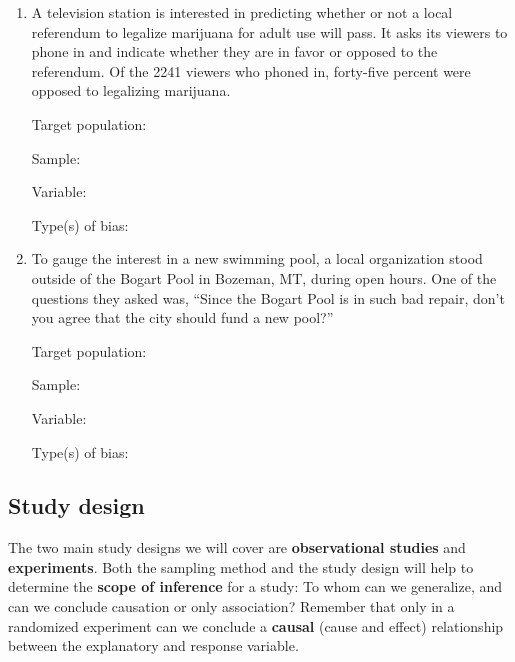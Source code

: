\documentclass[
]{report}
\begin{document}
\newpage

\begin{enumerate}
\def\labelenumi{\arabic{enumi}.}
\setcounter{enumi}{2}
\item
  A television station is interested in predicting whether or not a local referendum to legalize marijuana for adult use will pass. It asks its viewers to phone in and indicate whether they are in favor or opposed to the referendum. Of the 2241 viewers who phoned in, forty-five percent were opposed to legalizing marijuana.
  \vspace{0.1in}

  Target population:
  \vspace{0.3in}

  Sample:
  \vspace{0.3in}

  Variable:
  \vspace{0.3in}

  Type(s) of bias:
  \vspace{0.3in}
\item
  To gauge the interest in a new swimming pool, a local organization stood outside of the Bogart Pool in Bozeman, MT, during open hours. One of the questions they asked was, ``Since the Bogart Pool is in such bad repair, don't you agree that the city should fund a new pool?''
  \vspace{0.1in}

  Target population:
  \vspace{0.3in}

  Sample:
  \vspace{0.3in}

  Variable:
  \vspace{0.3in}

  Type(s) of bias:
  \vspace{0.3in}
\end{enumerate}

\newpage

\hypertarget{study-design-1}{%
\subsection{Study design}\label{study-design-1}}

The two main study designs we will cover are \textbf{observational studies} and \textbf{experiments}. Both the sampling method and the study design will help to determine the \textbf{scope of inference} for a study: To whom can we generalize, and can we conclude causation or only association? Remember that only in a randomized experiment can we conclude a \textbf{causal} (cause and effect) relationship between the explanatory and response variable.
\end{document}
